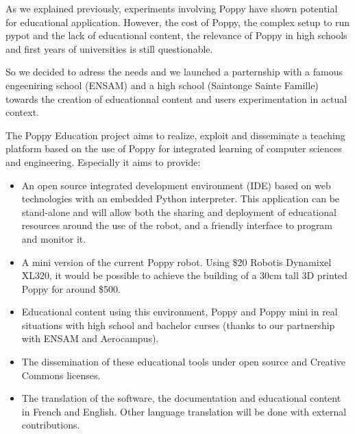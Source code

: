 As we explained previously, experiments involving Poppy have shown potential for educational application. However, the cost of Poppy, the complex setup to run pypot and the lack of educational content, the relevance of Poppy in high schools and first years of universities is still questionable.

So we decided to adress the needs and we launched a parternship with a famous engeeniring school (ENSAM) and a high school (Saintonge Sainte Famille) towards the creation of educationnal content and users experimentation in actual context.

The Poppy Education project aims to realize, exploit and disseminate a teaching platform based on the use of Poppy for integrated learning of computer sciences and engineering. Especially it aims to provide:
\begin{itemize}
    \item An open source integrated development environment (IDE) based on web technologies with an embedded Python interpreter. This application can be stand-alone and will allow both the sharing and deployment of educational resources around the use of the robot, and a friendly interface to program and monitor it.
    \item A mini version of the current Poppy robot. Using \$20 Robotis Dynamixel XL320, it would be possible to achieve the building of a 30cm tall 3D printed Poppy for around \$500.
    \item Educational content using this environment, Poppy and Poppy mini in real situations with high school and bachelor curses (thanks to our partnership with ENSAM and Aerocampus).
    \item The dissemination of these educational tools under open source and Creative Commons licenses.
    \item The translation of the software, the documentation and educational content in French and English. Other language translation will be done with external contributions.
\end{itemize}





